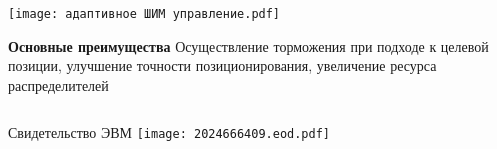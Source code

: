 \begin{frame}
\begin{columns}[T]
		\begin{column}{0.5\textwidth}
			\centering
			\begin{minipage}{\textwidth}
				\centering
				\texttt{[image: адаптивное ШИМ управление.pdf]}
			\end{minipage}

			\begin{block}{\scriptsize \textbf{Основные преимущества}}
				\scriptsize
				Осуществление торможения при подходе к целевой позиции, улучшение точности позиционирования, увеличение ресурса распределителей
			\end{block}


		\end{column}

	\end{columns}
\end{frame}

\begin{frame}{Свидетельство ЭВМ}
	\centering
	\texttt{[image: 2024666409.eod.pdf]}
\end{frame}


